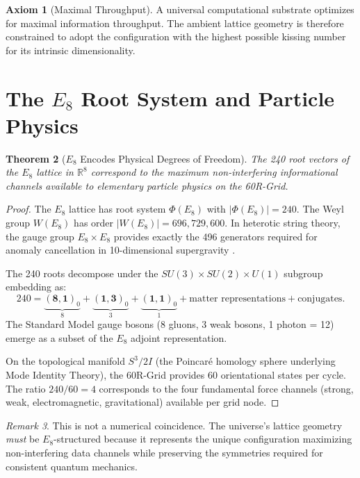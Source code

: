 \documentclass[12pt, a4paper]{article}
\theoremstyle{plain}
\newtheorem{theorem}{Theorem}[section]
\theoremstyle{definition}
\newtheorem{axiom}[theorem]{Axiom}
\theoremstyle{remark}
\newtheorem{remark}[theorem]{Remark}
\begin{document}
\begin{axiom}[Maximal Throughput]
A universal computational substrate optimizes for maximal information throughput. The ambient lattice geometry is therefore constrained to adopt the configuration with the highest possible kissing number for its intrinsic dimensionality.
\end{axiom}

\section{The $E_8$ Root System and Particle Physics}\label{sec:e8physics}

\begin{theorem}[$E_8$ Encodes Physical Degrees of Freedom]
The 240 root vectors of the $E_8$ lattice in $\mathbb{R}^8$ correspond to the maximum non-interfering informational channels available to elementary particle physics on the 60R-Grid.
\end{theorem}

\begin{proof}
The $E_8$ lattice has root system $\Phi(E_8)$ with $|\Phi(E_8)| = 240$. The Weyl group $W(E_8)$ has order $|W(E_8)| = 696{,}729{,}600$. In heterotic string theory, the gauge group $E_8 \times E_8$ provides exactly the 496 generators required for anomaly cancellation in 10-dimensional supergravity \citep{GreenSchwarz1984}.

The 240 roots decompose under the $SU(3) \times SU(2) \times U(1)$ subgroup embedding as:
\begin{equation}
    240 = \underbrace{(\mathbf{8}, \mathbf{1})_0}_{8} + \underbrace{(\mathbf{1}, \mathbf{3})_0}_{3} + \underbrace{(\mathbf{1}, \mathbf{1})_0}_{1} + \text{matter representations} + \text{conjugates}.
\end{equation}
The Standard Model gauge bosons (8 gluons, 3 weak bosons, 1 photon = 12) emerge as a subset of the $E_8$ adjoint representation.

On the topological manifold $S^3/2I$ (the Poincar\'{e} homology sphere underlying Mode Identity Theory), the 60R-Grid provides 60 orientational states per cycle. The ratio $240/60 = 4$ corresponds to the four fundamental force channels (strong, weak, electromagnetic, gravitational) available per grid node.
\end{proof}

\begin{remark}
This is not a numerical coincidence. The universe's lattice geometry \emph{must} be $E_8$-structured because it represents the unique configuration maximizing non-interfering data channels while preserving the symmetries required for consistent quantum mechanics.
\end{remark}
\end{document}
